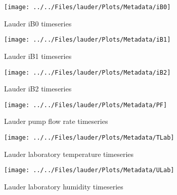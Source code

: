     \begin{figure}
        \centering
\texttt{[image: ../../Files/lauder/Plots/Metadata/iB0]}
    \caption{Lauder iB0 timeseries}
            \label{fig:iB0}
    \end{figure}

    \begin{figure}
        \centering
\texttt{[image: ../../Files/lauder/Plots/Metadata/iB1]}
    \caption{Lauder iB1 timeseries}
            \label{fig:iB1}
    \end{figure}

    \begin{figure}
        \centering
\texttt{[image: ../../Files/lauder/Plots/Metadata/iB2]}
    \caption{Lauder iB2 timeseries}
            \label{fig:iB2}
    \end{figure}

    \begin{figure}
        \centering
\texttt{[image: ../../Files/lauder/Plots/Metadata/PF]}
    \caption{Lauder pump flow rate timeseries}
            \label{fig:PF}
    \end{figure}



           \begin{figure}
        \centering
\texttt{[image: ../../Files/lauder/Plots/Metadata/TLab]}
    \caption{Lauder laboratory temperature timeseries}
            \label{fig:TLab}
    \end{figure}

               \begin{figure}
        \centering
\texttt{[image: ../../Files/lauder/Plots/Metadata/ULab]}
    \caption{Lauder laboratory humidity timeseries}
            \label{fig:ULab}
    \end{figure}

